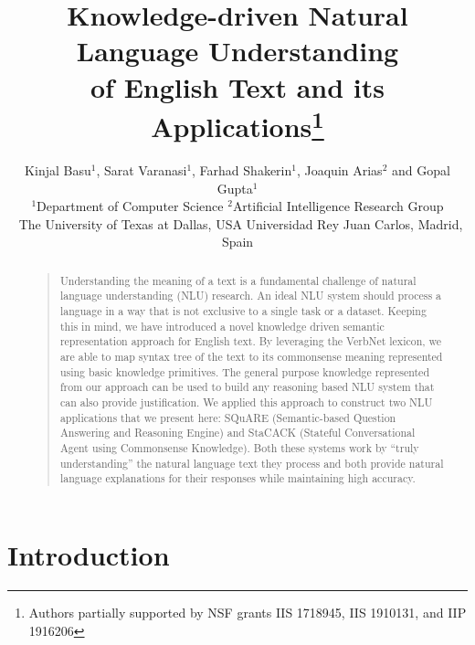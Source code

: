 \documentclass[letterpaper]{article}
\begin{document}
\title{Knowledge-driven Natural Language Understanding\\of English Text and its Applications\thanks{Authors partially supported by NSF grants IIS 1718945, IIS 1910131, and IIP 1916206}}

\author {
Kinjal Basu$^1$, Sarat  Varanasi$^1$, Farhad Shakerin$^1$, Joaquin Arias$^2$ and Gopal Gupta$^1$\\[.5em]
{  \large $^1$Department of Computer Science \hfill $^2$Artificial Intelligence Research Group}\\{\large ~\hspace{.3em}The University of Texas at Dallas, USA\hspace{.7em} \hfill Universidad Rey Juan Carlos, Madrid, Spain}
}



\maketitle
\begin{abstract}
\begin{quote}
Understanding the meaning of a text is a fundamental challenge of natural language understanding (NLU) research. An ideal NLU system should process a language in a way that is not exclusive to a single task or a dataset. Keeping this in mind, we have introduced a novel knowledge driven semantic representation approach for English text. By leveraging the VerbNet lexicon, we are able to map syntax tree of the text to its commonsense meaning represented using basic knowledge primitives. The general purpose knowledge represented from our approach can be used to build any reasoning based NLU system that can also provide justification. We applied this approach to construct two NLU applications that we present here: SQuARE (Semantic-based Question Answering and Reasoning Engine) and StaCACK (Stateful Conversational Agent using Commonsense Knowledge).
Both these systems work by ``truly understanding'' the natural language text they process and both provide natural language explanations for their responses while maintaining high accuracy.

\end{quote}
\end{abstract}

\section{Introduction}
\end{document}
